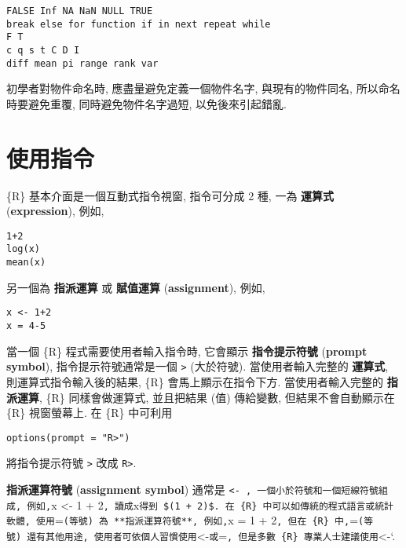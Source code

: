 \documentclass[
]{book}
\begin{document}
\begin{verbatim}
FALSE Inf NA NaN NULL TRUE
break else for function if in next repeat while
F T
c q s t C D I
diff mean pi range rank var
\end{verbatim}

初學者對物件命名時, 應盡量避免定義一個物件名字,
與現有的物件同名, 所以命名時要避免重覆,
同時避免物件名字過短, 以免後來引起錯亂.

\hypertarget{ux4f7fux7528ux6307ux4ee4}{%
\section{使用指令}\label{ux4f7fux7528ux6307ux4ee4}}

\{R\} 基本介面是一個互動式指令視窗,
指令可分成 2 種,
一為
\textbf{運算式}
(\textbf{expression}),
例如,

\begin{verbatim}
1+2
log(x)
mean(x)
\end{verbatim}

另一個為
\textbf{指派運算}
或
\textbf{賦值運算}
(\textbf{assignment}),
例如,

\begin{verbatim}
x <- 1+2
x = 4-5
\end{verbatim}

當一個 \{R\} 程式需要使用者輸入指令時,
它會顯示
\textbf{指令提示符號}
(\textbf{prompt symbol}),
指令提示符號通常是一個 \texttt{\textgreater{}} (大於符號).
當使用者輸入完整的
\textbf{運算式},
則運算式指令輸入後的結果,
\{R\} 會馬上顯示在指令下方.
當使用者輸入完整的
\textbf{指派運算},
\{R\} 同樣會做運算式,
並且把結果 (值) 傳給變數,
但結果不會自動顯示在 \{R\} 視窗螢幕上.
在 \{R\} 中可利用

\begin{verbatim}
options(prompt = "R>")
\end{verbatim}

將指令提示符號 \texttt{\textgreater{}} 改成 \texttt{R\textgreater{}}.

\textbf{指派運算符號}
(\textbf{assignment symbol})
通常是 \texttt{\textless{}-\ \textasciigrave{}\textasciigrave{},\ 一個小於符號和一個短線符號組成,\ 例如,}x \textless- 1 + 2\texttt{,\ 讀成}x\texttt{\textasciigrave{}\textasciigrave{}得到\textquotesingle{}\textquotesingle{}\ \$(1\ +\ 2)\$.\ 在\ \{R\}\ 中可以如傳統的程式語言或統計軟體,\ 使用}=\texttt{(等號)\ 為\ **指派運算符號**,\ 例如,}x = 1 + 2\texttt{,\ 但在\ \{R\}\ 中,}=\texttt{(等號)\ 還有其他用途,\ 使用者可依個人習慣使用}\textless-\texttt{或}=\texttt{,\ 但是多數\ \{R\}\ 專業人士建議使用}\textless-`.
\end{document}
